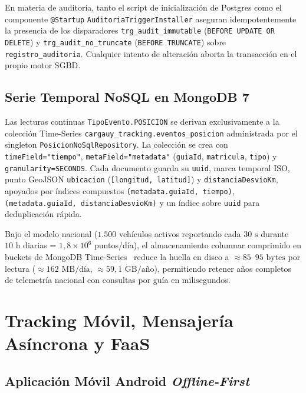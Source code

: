 \documentclass[11pt,a4paper,twocolumn]{article}
\begin{document}
En materia de auditoría, tanto el script de inicialización de Postgres como el componente \texttt{@Startup} \texttt{AuditoriaTriggerInstaller} aseguran idempotente\-mente la presencia de los disparadores \texttt{trg\_audit\_immutable} (\texttt{BEFORE UPDATE OR DELETE}) y \texttt{trg\_audit\_no\_truncate} (\texttt{BEFORE TRUNCATE}) sobre \texttt{registro\_auditoria}. Cualquier intento de alteración aborta la transacción en el propio motor SGBD.

\subsection{Serie Temporal NoSQL en MongoDB 7}

Las lecturas continuas \texttt{TipoEvento.POSICION} se derivan exclusivamente a la colección Time-Series \texttt{cargauy\_tracking.eventos\_posicion} administrada por el singleton \texttt{PosicionNoSqlRepository}. La colección se crea con \texttt{timeField="tiempo"}, \texttt{metaField="metadata"} (\texttt{guiaId}, \texttt{matricula}, \texttt{tipo}) y \texttt{granularity=SECONDS}. Cada documento guarda su \texttt{uuid}, marca temporal ISO, punto GeoJSON \texttt{ubicacion} (\texttt{[longitud, latitud]}) y \texttt{distanciaDesvioKm}, apoyados por índices compuestos \texttt{(metadata.guiaId, tiempo)}, \texttt{(metadata.guiaId, distanciaDesvioKm)} y un índice sobre \texttt{uuid} para deduplicación rápida.

Bajo el modelo nacional ($1.500$ vehículos activos reportando cada $30\text{ s}$ durante $10\text{ h}$ diarias = $1{,}8\times 10^6$ puntos/día), el almacenamiento columnar comprimido en buckets de MongoDB Time-Series~\cite{mongo} reduce la huella en disco a $\approx 85\text{--}95\text{ bytes}$ por lectura ($\approx 162\text{ MB/día}$, $\approx 59{,}1\text{ GB/año}$), permitiendo retener años completos de telemetría nacional con consultas por guía en milisegundos.

\section{Tracking Móvil, Mensajería Asíncrona y FaaS}\label{sec:flujos}

\subsection{Aplicación Móvil Android \texorpdfstring{\textit{Offline-First}}{Offline-First}}
\end{document}
